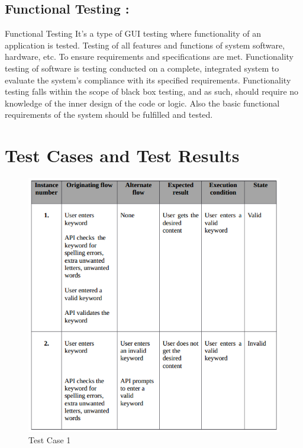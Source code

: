 \documentclass[oneside,a4paper,12pt]{report}
\begin{document}
{\subsection{Functional Testing : }
Functional Testing It’s a type of GUI testing where functionality of an application is tested. Testing of all features and functions of system software, hardware, etc. To ensure requirements and specifications are met. Functionality testing of software is testing conducted on a complete, integrated system to evaluate the system’s compliance with its specified requirements. Functionality testing falls within the scope of black box testing, and as such, should require no knowledge of the inner design of the code or logic. Also the basic functional requirements of the system should be fulfilled and tested.

\section{Test Cases and Test Results}
\begin{figure}[h]
\includegraphics{test-case-1}
\caption{Test Case 1}
\end{figure}

}
\end{document}
